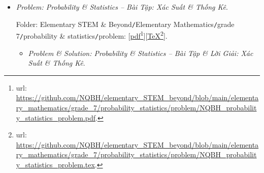 \documentclass[12pt]{article}
\begin{document}
\begin{itemize}
	Folder: {\sf Elementary STEM \& Beyond{\tt/}Elementary Mathematics{\tt/}grade 7{\tt/}angle parallel line{\tt/}problem}: [\href{https://github.com/NQBH/elementary_STEM_beyond/blob/main/elementary_mathematics/grade_7/angle_parallel_line/problem/NQBH_angle_parallel_line_problem.pdf}{pdf}\footnote{{\sc url}: \url{https://github.com/NQBH/elementary_STEM_beyond/blob/main/elementary_mathematics/grade_7/angle_parallel_line/problem/NQBH_angle_parallel_line_problem.pdf}.}][\href{https://github.com/NQBH/elementary_STEM_beyond/blob/main/elementary_mathematics/grade_7/angle_parallel_line/problem/NQBH_angle_parallel_line_problem.tex}{\TeX}\footnote{{\sc url}: \url{https://github.com/NQBH/elementary_STEM_beyond/blob/main/elementary_mathematics/grade_7/angle_parallel_line/problem/NQBH_angle_parallel_line_problem.tex}.}].
	\begin{itemize}
		\item {\it Problem \& Solution: Angle \& Parallel Line -- Bài Tập \& Lời Giải: Góc \& Đường Thẳng Song Song}.
		
		Folder: {\sf Elementary STEM \& Beyond{\tt/}Elementary Mathematics{\tt/}grade 7{\tt/}angle parallel line{\tt/}solution}: [\href{https://github.com/NQBH/elementary_STEM_beyond/blob/main/elementary_mathematics/grade_7/angle_parallel_line/solution/NQBH_angle_parallel_line_solution.pdf}{pdf}\footnote{{\sc url}: \url{https://github.com/NQBH/elementary_STEM_beyond/blob/main/elementary_mathematics/grade_7/angle_parallel_line/solution/NQBH_angle_parallel_line_solution.pdf}.}][\href{https://github.com/NQBH/elementary_STEM_beyond/blob/main/elementary_mathematics/grade_7/angle_parallel_line/solution/NQBH_angle_parallel_line_solution.tex}{\TeX}\footnote{{\sc url}: \url{https://github.com/NQBH/elementary_STEM_beyond/blob/main/elementary_mathematics/grade_7/angle_parallel_line/solution/NQBH_angle_parallel_line_solution.tex}.}].
	\end{itemize}
	\item {\it Problem: Probability \& Statistics -- Bài Tập: Xác Suất \& Thống Kê}.
	
	Folder: {\sf Elementary STEM \& Beyond{\tt/}Elementary Mathematics{\tt/}grade 7{\tt/}probability \& statistics{\tt/}problem}: [\href{https://github.com/NQBH/elementary_STEM_beyond/blob/main/elementary_mathematics/grade_7/probability_statistics/problem/NQBH_probability_statistics_problem.pdf}{pdf}\footnote{{\sc url}: \url{https://github.com/NQBH/elementary_STEM_beyond/blob/main/elementary_mathematics/grade_7/probability_statistics/problem/NQBH_probability_statistics_problem.pdf}.}][\href{https://github.com/NQBH/elementary_STEM_beyond/blob/main/elementary_mathematics/grade_7/probability_statistics/problem/NQBH_probability_statistics_problem.tex}{\TeX}\footnote{{\sc url}: \url{https://github.com/NQBH/elementary_STEM_beyond/blob/main/elementary_mathematics/grade_7/probability_statistics/problem/NQBH_probability_statistics_problem.tex}.}].
	\begin{itemize}
		\item {\it Problem \& Solution: Probability \& Statistics -- Bài Tập \& Lời Giải: Xác Suất \& Thống Kê}.
		

\end{itemize}
\end{itemize}
\end{document}
